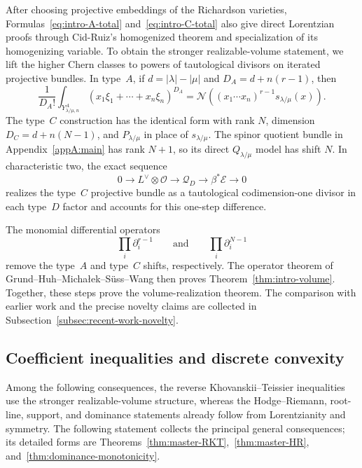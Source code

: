 \documentclass[11pt,a4paper,oneside]{amsart}
\numberwithin{equation}{section}
\theoremstyle{definition}
\theoremstyle{remark}
\newcommand{\cN}{\mathcal N}
\begin{document}
After choosing projective embeddings of the Richardson varieties, Formulas~\eqref{eq:intro-A-total} and~\eqref{eq:intro-C-total} also give direct Lorentzian proofs through Cid-Ruiz's homogenized theorem and specialization of its homogenizing variable.  To obtain the stronger realizable-volume statement, we lift the higher Chern classes to powers of tautological divisors on iterated projective bundles.  In type~$A$, if $d=|\lambda|-|\mu|$ and $D_A=d+n(r-1)$, then
\begin{equation}\label{eq:intro-A-volume}
 \frac1{D_A!}\int_{Y^A_{\lambda/\mu,n}}
 (x_1\xi_1+\cdots+x_n\xi_n)^{D_A}
 =\cN\!\left((x_1\cdots x_n)^{r-1}s_{\lambda/\mu}(x)\right).
\end{equation}
The type~$C$ construction has the identical form with rank $N$, dimension $D_C=d+n(N-1)$, and $P_{\lambda/\mu}$ in place of $s_{\lambda/\mu}$.  The spinor quotient bundle in Appendix~\ref{appA:main} has rank $N+1$, so its direct $Q_{\lambda/\mu}$ model has shift $N$.  In characteristic two, the exact sequence
\[
 0\longrightarrow L^\vee\otimes\mathcal O
 \longrightarrow\mathcal Q_D
 \longrightarrow\beta^*\mathcal E
 \longrightarrow0
\]
realizes the type~$C$ projective bundle as a tautological codimension-one divisor in each type~$D$ factor and accounts for this one-step difference.

The monomial differential operators
\[
 \prod_i\partial_i^{r-1}
 \qquad\text{and}\qquad
 \prod_i\partial_i^{N-1}
\]
remove the type~$A$ and type~$C$ shifts, respectively.  The operator theorem of Grund--Huh--Micha\l ek--S\"uss--Wang then proves Theorem~\ref{thm:intro-volume}.  Together, these steps prove the volume-realization theorem.  The comparison with earlier work and the precise novelty claims are collected in Subsection~\ref{subsec:recent-work-novelty}.

\subsection{Coefficient inequalities and discrete convexity}

Among the following consequences, the reverse Khovanskii--Teissier inequalities use the stronger realizable-volume structure, whereas the Hodge--Riemann, root-line, support, and dominance statements already follow from Lorentzianity and symmetry.  The following statement collects the principal general consequences; its detailed forms are Theorems~\ref{thm:master-RKT},~\ref{thm:master-HR}, and~\ref{thm:dominance-monotonicity}.
\end{document}
